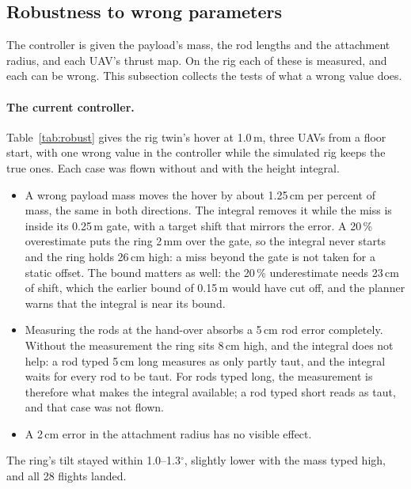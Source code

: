 
\subsection{Robustness to wrong parameters}
\label{sec:sim_robustness}

The controller is given the payload's mass, the rod lengths and the attachment radius, and each UAV's
thrust map. On the rig each of these is measured, and each can be wrong. This subsection collects the
tests of what a wrong value does.

\paragraph{The current controller.} Table~\ref{tab:robust} gives the rig twin's hover at 1.0\,m, three
UAVs from a floor start, with one wrong value in the controller while the simulated rig keeps the true
ones. Each case was flown without and with the height integral.
\begin{itemize}
    \item A wrong payload mass moves the hover by about 1.25\,cm per percent of mass, the same in
    both directions. The integral removes it while the miss is inside its 0.25\,m gate, with a target
    shift that mirrors the error. A 20\,\% overestimate puts the ring 2\,mm over the gate, so the
    integral never starts and the ring holds 26\,cm high: a miss beyond the gate is not taken for a
    static offset. The bound matters as well: the 20\,\% underestimate needs 23\,cm of shift, which
    the earlier bound of 0.15\,m would have cut off, and the planner warns that the integral is near
    its bound.
    \item Measuring the rods at the hand-over absorbs a 5\,cm rod error completely. Without the
    measurement the ring sits 8\,cm high, and the integral does not help: a rod typed 5\,cm long
    measures as only partly taut, and the integral waits for every rod to be taut. For rods typed
    long, the measurement is therefore what makes the integral available; a rod typed short reads as
    taut, and that case was not flown.
    \item A 2\,cm error in the attachment radius has no visible effect.
\end{itemize}
The ring's tilt stayed within 1.0--1.3$^\circ$, slightly lower with the mass typed high, and all 28
flights landed.

